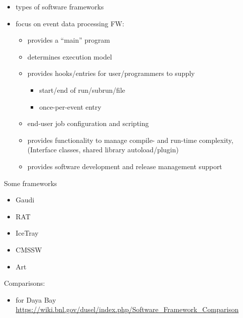 \begin{itemize}
\item types of software frameworks
\item focus on event data processing FW:
  \begin{itemize}
  \item provides a ``main'' program
  \item determines execution model
  \item provides hooks/entries for user/programmers to supply
    \begin{itemize}
    \item start/end of run/subrun/file
    \item once-per-event entry
    \end{itemize}
  \item end-user job configuration and scripting
  \item provides functionality to manage compile- and run-time complexity, (Interface classes, shared library autoload/plugin)
  \item provides software development and release management support
  \end{itemize}
\end{itemize}
Some frameworks
\begin{itemize}
\item Gaudi
\item RAT
\item IceTray
\item CMSSW
\item Art
\end{itemize}
Comparisons:
\begin{itemize}
\item for Daya Bay \url{https://wiki.bnl.gov/dusel/index.php/Software_Framework_Comparison}
\end{itemize}
